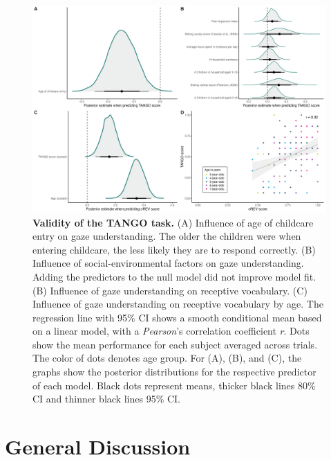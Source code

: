\documentclass[
  man,floatsintext]{apa7}
\begin{document}
\begin{figure}

{\centering \includegraphics[width=1\linewidth]{../figures/tango_vali_arrangedplot} 

}

\caption{\textbf{Validity of the TANGO task.} (A) Influence of age of childcare entry on gaze understanding. The older the children were when entering childcare, the less likely they are to respond correctly. (B) Influence of social-environmental factors on gaze understanding. Adding the predictors to the null model did not improve model fit. (B) Influence of gaze understanding on receptive vocabulary. (C) Influence of gaze understanding on receptive vocabulary by age. The regression line with 95\% CI shows a smooth conditional mean based on a linear model, with a \emph{Pearson}'s correlation coefficient \emph{r}. Dots show the mean performance for each subject averaged across trials. The color of dots denotes age group. For (A), (B), and (C), the graphs show the posterior distributions for the respective predictor of each model. Black dots represent means, thicker black lines 80\% CI and thinner black lines 95\% CI.}\label{fig:fig4}
\end{figure}

\hypertarget{general-discussion}{%
\section{General Discussion}\label{general-discussion}}
\end{document}
